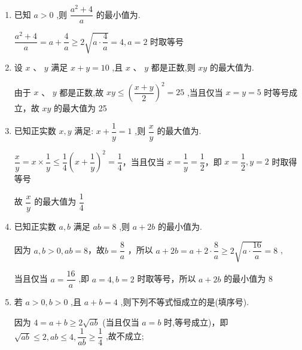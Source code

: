 \begin{enumerate}
\begin{jieda}
        所以 $x < 0$ 时, ${y} = {x} + \dfrac{1}{{x}}$ 的最大值是 -2 .
    \end{jieda}
    \item 已知 $a > 0$ ,则 $\dfrac{{a}^{2} + 4}{a}$ 的最小值为.
    \begin{jieda}
        $\dfrac{{a}^{2} + 4}{a} = a + \dfrac{4}{a} \geq  2\sqrt{a \cdot  \dfrac{4}{a}} = 4,a = 2$ 时取等号
    \end{jieda}
    \item 设 $x$ 、 $y$ 满足 $x + y = {10}$ ,且 $x$ 、 $y$ 都是正数,则 ${xy}$ 的最大值为.
    \begin{jieda}
        由于 $x$ 、 $y$ 都是正数,故 ${xy} \leq  {\left( \dfrac{x + y}{2}\right) }^{2} = {25}$ ,当且仅当 $x = y = 5$ 时等号成立，故 ${xy}$ 的最大值为 25
    \end{jieda}
    \item 已知正实数 $x,y$ 满足: $x + \dfrac{1}{y} = 1$ ,则 $\dfrac{x}{y}$ 的最大值为.
    \begin{jieda}
        $\dfrac{x}{y} = x \times  \dfrac{1}{y} \leq  \dfrac{1}{4}{\left( x + \dfrac{1}{y}\right) }^{2} = \dfrac{1}{4}$，当且仅当 $x = \dfrac{1}{y} = \dfrac{1}{2}$，即 $x = \dfrac{1}{2},y = 2$ 时取得等号
        
        故 $\dfrac{x}{y}$ 的最大值为 $\dfrac{1}{4}$
    \end{jieda}
    \item 已知正实数 $a,b$ 满足 ${ab} = 8$ ,则 $a + {2b}$ 的最小值为.
    \begin{jieda}
        因为 $a,b > 0,{ab} = 8$，故$b = \dfrac{8}{a}$ ，所以 $a + {2b} = a + 2 \cdot  \dfrac{8}{a} \geq  2\sqrt{a \cdot  \dfrac{16}{a}} = 8$ ,
        
        当且仅当 $a = \dfrac{16}{a}$ ,即 $a = 4,b = 2$ 时取等号，所以 $a + {2b}$ 的最小值为 8
    \end{jieda}
    
    \item 若 $a > 0,b > 0$ ,且 $a + b = 4$ ,则下列不等式恒成立的是(填序号).
    \begin{jieda}
        因为 $4 = a + b \geq  2\sqrt{ab}$ (当且仅当 $a = b$ 时,等号成立)，即 $\sqrt{ab} \leq  2,{ab} \leq  4,\dfrac{1}{ab} \geq  \dfrac{1}{4}$ ,故不成立;
        

\end{jieda}
\end{enumerate}
